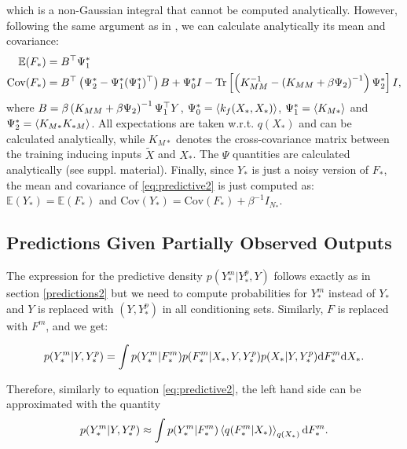 \documentclass [10pt , a4paper]{article}
\begin{document}
%
which is a non-Gaussian integral that cannot be computed analytically. However, following the same argument as in
\cite{rasmussen-williams, Girard03gaussianprocess}, we can
calculate analytically its mean and covariance:
%
\begin{align}
 \mathbb{E}(F_*) ={}&  B^{\top} \Psi_1^* \label{meanFstar} \\
 \text{Cov}(F_*) ={}& B^{\top} \left( \Psi_2^* - \Psi_1^* (\Psi_1^*)^{\top} \right) B + \Psi_0^* I - \text{Tr} \left[ \left( K_{MM}^{-1} - \left( K_{MM} + \beta \Psi_2 \right)^{-1} \right) \Psi_2^* \right] I, \label{covFstar}
\end{align}
%
where $B = \beta \left( K_{MM} + \beta \Psi_2 \right)^{-1} \Psi_1^{\top}
Y$, $\Psi_0^* = \left\langle k_f(X_*, X_*) \right\rangle$, $\Psi_1^* = \left\langle K_{M*} \right\rangle$
and $\Psi_2^* = \left\langle K_{M*} K_{*M} \right\rangle$. All expectations are taken
w.r.t. $q(X_*)$ and can be calculated analytically, while $K_{M*}$
denotes the cross-covariance matrix between the training inducing
inputs $\tilde{X}$ and $X_*$. The $\Psi$ quantities are calculated analytically (see suppl. material). Finally, since $Y_*$ is just a noisy version of
$F_*$, the mean and covariance of \eqref{eq:predictive2} is just
computed as: $\mathbb{E}(Y_*) = \mathbb{E}(F_*)$ and $\text{Cov}(Y_*)
= \text{Cov}(F_*) + \beta^{-1} I_{N_*}$.

\subsection{\label{predictions3} Predictions Given Partially Observed Outputs}

The expression for the predictive density $p(Y_*^m | Y_*^p, Y)$ follows exactly as in section \ref{predictions2} but we
need to compute probabilities for $Y_*^m$ instead of $Y_*$ and $Y$ is replaced with $(Y, Y_*^p)$ in all conditioning sets. Similarly,
$F$ is replaced with $F^m$, and we get:

\begin{equation}
p(Y_*^m | Y, Y_*^p) =  \int p(Y_*^m | F_*^m)  p(F_*^m | X_*, Y, Y_*^p) p(X_*| Y, Y_*^p) \text{d}  F_*^m \text{d}  X_* .
\end{equation}

Therefore, similarly to equation \eqref{eq:predictive2}, the left hand side can be approximated with the quantity
\begin{equation}
  \label{eq:predictive3}
  p(Y_*^m | Y, Y_*^p) \approx  \int p(Y_*^m | F_*^m) \left\langle q(F_*^m | X_*) \right\rangle_{q(X_*)} \text{d} F_*^m .
\end{equation}
\end{document}
